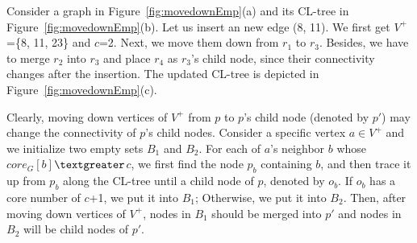 \begin{example}
\label{eg:goDown}
Consider a graph in Figure~\ref{fig:movedownEmp}(a) and its CL-tree in Figure~\ref{fig:movedownEmp}(b).
Let us insert an new edge (8, 11). We first get $V^+$=\{8, 11, 23\} and $c$=2.
Next, we move them down from $r_1$ to $r_3$.
Besides, we have to merge $r_2$ into $r_3$ and place $r_4$ as $r_3$'s child node,
since their connectivity changes after the insertion.
The updated CL-tree is depicted in Figure~\ref{fig:movedownEmp}(c).
\end{example}


Clearly, moving down vertices of $V^+$ from $p$ to $p$'s child node (denoted by $p'$) may change the connectivity of $p$'s child nodes.
Consider a specific vertex $a$$\in$$V^+$ and we initialize two empty sets $B_1$ and $B_2$.
For each of $a$'s neighbor $b$ whose $core_G[b]$$\textgreater$$c$, we first find the node $p_b$ containing $b$,
and then trace it up from $p_b$ along the CL-tree until a child node of $p$, denoted by $o_b$.
If $o_b$ has a core number of $c$+1, we put it into $B_1$;
Otherwise, we put it into $B_2$.
Then, after moving down vertices of $V^+$,
nodes in $B_1$ should be merged into $p'$ and nodes in $B_2$ will be child nodes of $p'$.



